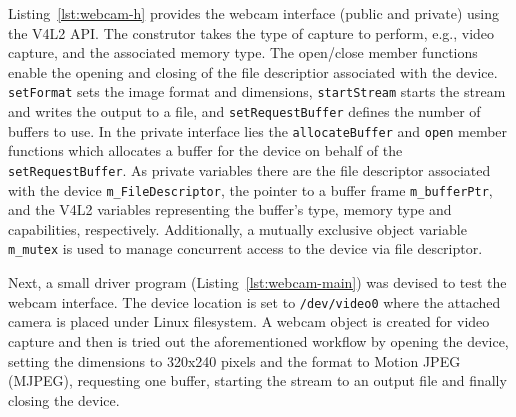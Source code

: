 Listing~\ref{lst:webcam-h} provides the webcam interface (public and private)
using the V4L2 API. The construtor takes the type of capture to perform, e.g.,
video capture, and the associated memory type. The open/close member functions
enable the opening and closing of the file descriptior associated with the
device. \texttt{setFormat} sets the image format and dimensions,
\texttt{startStream} starts the stream and writes the output to a file, and
\texttt{setRequestBuffer} defines the number of buffers to use. In the private
interface lies the \texttt{allocateBuffer} and \texttt{open} member functions which allocates a
buffer for the device on behalf of the \texttt{setRequestBuffer}. As private
variables there are the file descriptor associated with the device
\texttt{m\_FileDescriptor}, the pointer to a buffer frame \texttt{m\_bufferPtr},
and the V4L2 variables representing the buffer's type, memory type and
capabilities, respectively. Additionally, a mutually exclusive object variable
\texttt{m\_mutex} is used to manage concurrent access to the device via file descriptor.
%

Next, a small driver program (Listing~\ref{lst:webcam-main}) was devised to test
the webcam interface. The device location is set to \texttt{/dev/video0} where
the attached camera is placed under Linux filesystem. A webcam object is created
for video capture and then is tried out the aforementioned workflow by opening
the device, setting the dimensions to 320x240 pixels and the format to Motion
JPEG (MJPEG), requesting one buffer, starting the stream to an output file and
finally closing the device. 
%

%
